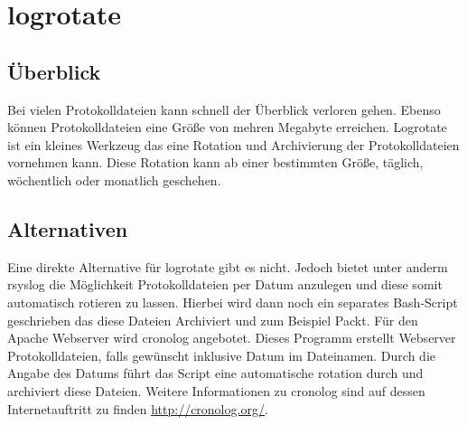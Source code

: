 \section{logrotate}
\subsection{Überblick}
Bei vielen Protokolldateien kann schnell der Überblick verloren gehen. Ebenso können Protokolldateien eine Größe von mehren Megabyte erreichen. Logrotate ist ein kleines Werkzeug das eine Rotation und Archivierung der Protokolldateien vornehmen kann. Diese Rotation kann ab einer bestimmten Größe, täglich, wöchentlich oder monatlich geschehen.

\subsection{Alternativen}
Eine direkte Alternative für logrotate gibt es nicht. Jedoch bietet unter anderm rsyslog die Möglichkeit Protokolldateien per Datum anzulegen und diese somit automatisch rotieren zu lassen. Hierbei wird dann noch ein separates Bash-Script geschrieben das diese Dateien Archiviert und zum Beispiel Packt.
Für den Apache Webserver wird cronolog angebotet. Dieses Programm erstellt Webserver Protokolldateien, falls gewünscht inklusive Datum im Dateinamen. Durch die Angabe des Datums führt das Script eine automatische rotation durch und archiviert diese Dateien. Weitere Informationen zu cronolog sind auf dessen Internetauftritt zu finden \url{http://cronolog.org/}. 
